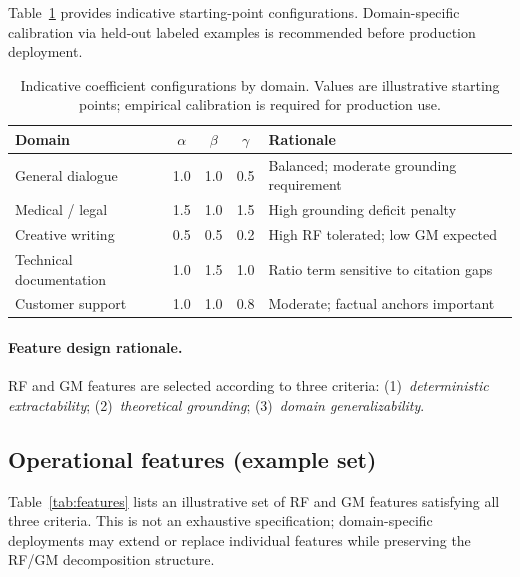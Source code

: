 \documentclass[11pt,a4paper]{article}
\begin{document}
Table~\ref{tab:coeff_guidance} provides indicative starting-point configurations.
Domain-specific calibration via held-out labeled examples is recommended before
production deployment.

\begin{table}[h]
\centering
\caption{Indicative coefficient configurations by domain. Values are illustrative
starting points; empirical calibration is required for production use.}
\label{tab:coeff_guidance}
\begin{tabular}{@{}lcccl@{}}
\toprule
Domain & $\alpha$ & $\beta$ & $\gamma$ & Rationale \\
\midrule
General dialogue     & 1.0 & 1.0 & 0.5 & Balanced; moderate grounding requirement \\
Medical / legal      & 1.5 & 1.0 & 1.5 & High grounding deficit penalty \\
Creative writing     & 0.5 & 0.5 & 0.2 & High RF tolerated; low GM expected \\
Technical documentation & 1.0 & 1.5 & 1.0 & Ratio term sensitive to citation gaps \\
Customer support     & 1.0 & 1.0 & 0.8 & Moderate; factual anchors important \\
\bottomrule
\end{tabular}
\end{table}

\paragraph{Feature design rationale.}
RF and GM features are selected according to three criteria:
(1)~\textit{deterministic extractability};
(2)~\textit{theoretical grounding};
(3)~\textit{domain generalizability}.

\subsection{Operational features (example set)}

Table~\ref{tab:features} lists an illustrative set of RF and GM features
satisfying all three criteria. This is not an exhaustive specification;
domain-specific deployments may extend or replace individual features
while preserving the RF/GM decomposition structure.
\end{document}
